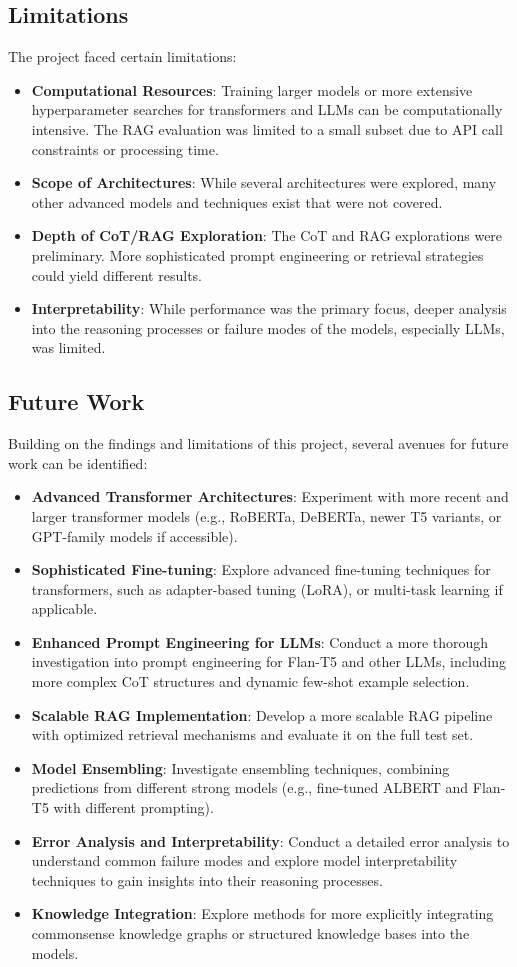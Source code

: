 \documentclass[10.5pt]{article}
\begin{document}
\subsection{Limitations}
The project faced certain limitations:
\begin{itemize}
    \item \textbf{Computational Resources}: Training larger models or more extensive hyperparameter searches for transformers and LLMs can be computationally intensive. The RAG evaluation was limited to a small subset due to API call constraints or processing time.
    \item \textbf{Scope of Architectures}: While several architectures were explored, many other advanced models and techniques exist that were not covered.
    \item \textbf{Depth of CoT/RAG Exploration}: The CoT and RAG explorations were preliminary. More sophisticated prompt engineering or retrieval strategies could yield different results.
    \item \textbf{Interpretability}: While performance was the primary focus, deeper analysis into the reasoning processes or failure modes of the models, especially LLMs, was limited.
\end{itemize}

\subsection{Future Work}
Building on the findings and limitations of this project, several avenues for future work can be identified:
\begin{itemize}
    \item \textbf{Advanced Transformer Architectures}: Experiment with more recent and larger transformer models (e.g., RoBERTa, DeBERTa, newer T5 variants, or GPT-family models if accessible).
    \item \textbf{Sophisticated Fine-tuning}: Explore advanced fine-tuning techniques for transformers, such as adapter-based tuning (LoRA), or multi-task learning if applicable.
    \item \textbf{Enhanced Prompt Engineering for LLMs}: Conduct a more thorough investigation into prompt engineering for Flan-T5 and other LLMs, including more complex CoT structures and dynamic few-shot example selection.
    \item \textbf{Scalable RAG Implementation}: Develop a more scalable RAG pipeline with optimized retrieval mechanisms and evaluate it on the full test set.
    \item \textbf{Model Ensembling}: Investigate ensembling techniques, combining predictions from different strong models (e.g., fine-tuned ALBERT and Flan-T5 with different prompting).
    \item \textbf{Error Analysis and Interpretability}: Conduct a detailed error analysis to understand common failure modes and explore model interpretability techniques to gain insights into their reasoning processes.
    \item \textbf{Knowledge Integration}: Explore methods for more explicitly integrating commonsense knowledge graphs or structured knowledge bases into the models.
\end{itemize}
\end{document}
